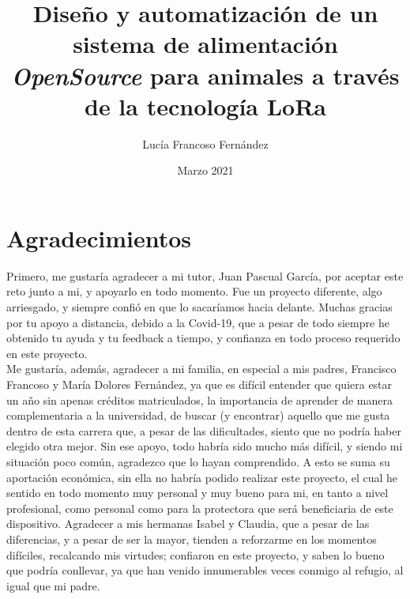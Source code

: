 \documentclass[12pt]{article}
\begin{document}

	\title{Diseño y automatización de un sistema de alimentación \textit{OpenSource} para animales a través de la tecnología LoRa}
	\author{Lucía Francoso Fernández}
	\date{Marzo 2021}
	
	\maketitle
	\pagebreak
	
	\tableofcontents
	
	\pagebreak

	\listoffigures
	
	\pagebreak
	
	\listoftables
	
	\pagebreak
	
	\section*{Agradecimientos}
	
	\noindent [Tutor] Primero, me gustaría agradecer a mi tutor, Juan Pascual García, por aceptar este reto junto a mi, y apoyarlo en todo momento. Fue un proyecto diferente, algo arriesgado, y siempre confió en que lo sacaríamos hacia delante. Muchas gracias por tu apoyo a distancia, debido a la Covid-19, que a pesar de todo siempre he obtenido tu ayuda y tu feedback a tiempo, y confianza en todo proceso requerido en este proyecto.\\
	
	\noindent [Mi familia]  Me gustaría, además, agradecer a mi familia, en especial a mis padres, Francisco Francoso y María Dolores Fernández, ya que es difícil entender que quiera estar un año sin apenas créditos matriculados, la importancia de aprender de manera complementaria a la universidad, de buscar (y encontrar) aquello que me gusta dentro de esta carrera que, a pesar de las dificultades, siento que no podría haber elegido otra mejor. Sin ese apoyo, todo habría sido mucho más difícil, y siendo mi situación poco común, agradezco que lo hayan comprendido. A esto se suma su aportación económica, sin ella no habría podido realizar este proyecto, el cual he sentido en todo momento muy personal y muy bueno para mi, en tanto a nivel profesional, como personal como para la protectora que será beneficiaria de este dispositivo. Agradecer a mis hermanas Isabel y Claudia, que a pesar de las diferencias, y a pesar de ser la mayor, tienden a reforzarme en los momentos difíciles, recalcando mis virtudes; confiaron en este proyecto, y saben lo bueno que podría conllevar, ya que han venido innumerables veces conmigo al refugio, al igual que mi padre.\\
	
\end{document}
